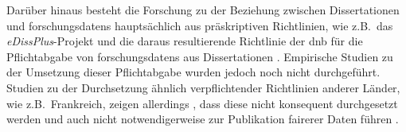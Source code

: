 Darüber hinaus besteht die Forschung zu der Beziehung zwischen Dissertationen und \glspl{forschungsdaten} hauptsächlich aus präskriptiven Richtlinien, wie z.B.~das \textit{eDissPlus}-Projekt \autocite{Weisbrod2017eDissPlus,Weisbrod2018,KleinebergKaden2018} und die daraus resultierende Richtlinie der \gls{dnb} für die Pflichtabgabe von \glspl{forschungsdaten} aus Dissertationen \autocite{dnb2017}.
Empirische Studien zu der Umsetzung dieser Pflichtabgabe wurden jedoch noch nicht durchgeführt.
Studien zu der Durchsetzung ähnlich verpflichtender Richtlinien anderer Länder, wie z.B.~Frankreich, zeigen allerdings , dass diese nicht konsequent durchgesetzt werden und auch nicht notwendigerweise zur Publikation \gls{fair}erer Daten führen \autocite[vgl.][]{Schöpfel2015}.